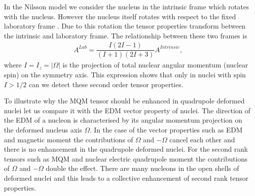 \documentclass[10pt,a4paper, twoside, openright]{report}
\begin{document}
In the Nilsson model we consider the nucleus in the intrinsic frame which rotates with the nucleus. However the nucleus itself rotates with respect to the fixed laboratory frame \cite{BohrMottVol2}. Due to this rotation the tensor properties transform between the intrinsic  and laboratory frame. The relationship between these two frames is \cite{BohrMottVol2}
\begin{align} \label{eq:RotationalFactor}
A^{Lab} = \dfrac{I\left(2I - 1\right)}{\left(I + 1 \right)\left(2I + 3\right)}A^{Intrinsic},
\end{align}
where $I=I_z= \left|\Omega\right|$ is the projection of total nuclear angular momentum (nuclear spin) on the symmetry axis. This expression shows that only in nuclei with spin $I > 1/2$ can we detect these second order tensor properties. 

To illustrate why the MQM tensor should be enhanced in quadrupole deformed nuclei let us compare it with  the EDM vector property of nuclei. The direction of the EDM of a nucleon is characterised by its angular momentum projection on the deformed nucleus axis $\Omega$. In the case of the vector properties such as EDM and magnetic moment the contributions of $\Omega$ and $-\Omega$ cancel each other and  there is no enhancement in the quadrupole deformed nuclei. For the second rank tensors such as MQM and nuclear electric quadrupole moment the contributions of $\Omega$ and $-\Omega$ double the effect. There are many nucleons in the open shells of deformed nuclei and this leads to a collective enhancement of second rank tensor properties.
\end{document}
